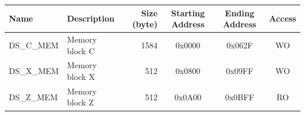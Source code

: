 \begin{longtable}{ | p{3cm} | p{3cm} | r | c | c | c | }
\hline
\rowcolor{lightgray}
Name & Description &  Size (byte) & Starting Address & Ending Address & Access \\ \hline
{DS\_C\_MEM}\label{DSCMEM}  & Memory block C  & 1584  & 0x0000 & 0x062F & WO \\ \hline
{DS\_X\_MEM}\label{DSXMEM}  & Memory block X  & 512  & 0x0800 & 0x09FF & WO \\ \hline
{DS\_Z\_MEM}\label{DSZMEM}  & Memory block Z  & 512  & 0x0A00 & 0x0BFF & RO \\ \hline
\end{longtable}
